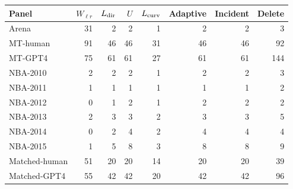 \begin{tabular}{lrrrrrrr}
\toprule
Panel & $W_{\ell r}$ & $L_{\rm dir}$ & $U$ & $L_{\rm curv}$ & Adaptive & Incident & Delete \\
\midrule
Arena & 31 & 2 & 2 & 1 & 2 & 2 & 3 \\
MT-human & 91 & 46 & 46 & 31 & 46 & 46 & 92 \\
MT-GPT4 & 75 & 61 & 61 & 27 & 61 & 61 & 144 \\
NBA-2010 & 2 & 2 & 2 & 1 & 2 & 2 & 3 \\
NBA-2011 & 1 & 1 & 1 & 1 & 1 & 1 & 2 \\
NBA-2012 & 0 & 1 & 2 & 1 & 2 & 2 & 2 \\
NBA-2013 & 2 & 3 & 3 & 2 & 3 & 3 & 5 \\
NBA-2014 & 0 & 2 & 4 & 2 & 4 & 4 & 4 \\
NBA-2015 & 1 & 5 & 8 & 3 & 8 & 8 & 9 \\
Matched-human & 51 & 20 & 20 & 14 & 20 & 20 & 39 \\
Matched-GPT4 & 55 & 42 & 42 & 20 & 42 & 42 & 96 \\
\bottomrule
\end{tabular}
